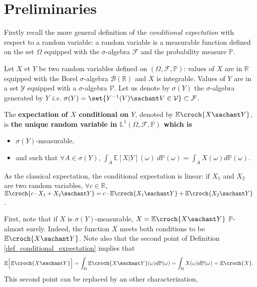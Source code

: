 \section{Preliminaries}
Firstly recall the more general definition of the \textit{conditional 
expectation} with respect to a random variable:
a random variable is a measurable function defined on the set $\Omega$
equipped with the $\sigma$-algebra $\mathcal{F}$ and the probability measure $\mathbb{P}$.
\begin{Def} \label{def_conditional_expectation}
Let $X$ et $Y$ be two random variables defined on $(\Omega,\mathcal{F},\mathbb{P})$:
values of $X$ are in $\mathbb{R}$ equipped with the Borel $\sigma$-algebra $\mathcal{B}(\mathbb{R})$ 
and $X$ is integrable. Values of $Y$ are in a set $\mathcal{Y}$ equipped with a $\sigma$-algebra $\mathcal{V}$.
Let us denote by $\sigma(Y)$ the $\sigma$-algebra generated 
by $Y$ \textit{i.e.} $\sigma(Y) = \set{ Y^{-1}(V) \sachant V \in \mathcal{V}} \subset \mathcal{F}$.

The \textbf{expectation of $X$ conditional on $Y$}, denoted by $\mathbb{E} \croch{ X \sachant Y }$, 
is \textbf{the unique random variable in $\mathbb{L}^1(\Omega,\mathcal{F},\mathbb{P})$ which is} 
\begin{itemize}
\item $\sigma(Y)$-measurable,
\item and such that $\forall A \in \sigma(Y)$, $\displaystyle \int_{A} \mathbb{E} [X \vert Y](\omega) \ d \mathbb{P}(\omega)
 = \int_{A} X(\omega) d \mathbb{P}(\omega)$.
\end{itemize}
As the classical expectation, the conditional expectation is linear: 
if $X_1$ and $X_2$ are two random variables, $\forall c \in \mathbb{R}$,
$\mathbb{E} \croch{ c\cdot X_1 + X_2 \sachant Y  } = c \cdot \mathbb{E} \croch{ X_1 \sachant Y  }  + \mathbb{E} \croch{ X_2 \sachant Y }$.
\end{Def}
First, note that if $X$ is $\sigma(Y)$-measurable, $X = \mathbb{E} \croch{ X \sachant Y }$ $\mathbb{P}$-almost surely.
Indeed, the function $X$ meets both conditions 
to be $ \mathbb{E} \croch{ X \sachant Y }$.
Note also that the second point of Definition \ref{def_conditional_expectation}
implies that \[ \mathbb{E} \Big[ \mathbb{E} \croch{ X \sachant Y } \Big] = \int_{\Omega} \mathbb{E} \croch{ X \sachant Y }(\omega) d \mathbb{P}(\omega) = \int_{\Omega} X(\omega) d \mathbb{P}(\omega) = \mathbb{E} \croch{X}. \] 
This second point 
can be replaced by an other characterization,
